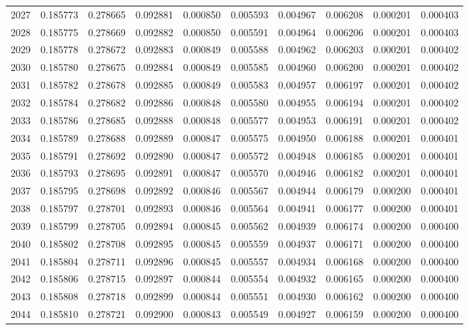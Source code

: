 \begin{tabular}{lrrrrrrrrr}
2027 & 0.185773 & 0.278665 & 0.092881 & 0.000850 & 0.005593 & 0.004967 & 0.006208 & 0.000201 & 0.000403 \\
2028 & 0.185775 & 0.278669 & 0.092882 & 0.000850 & 0.005591 & 0.004964 & 0.006206 & 0.000201 & 0.000403 \\
2029 & 0.185778 & 0.278672 & 0.092883 & 0.000849 & 0.005588 & 0.004962 & 0.006203 & 0.000201 & 0.000402 \\
2030 & 0.185780 & 0.278675 & 0.092884 & 0.000849 & 0.005585 & 0.004960 & 0.006200 & 0.000201 & 0.000402 \\
2031 & 0.185782 & 0.278678 & 0.092885 & 0.000849 & 0.005583 & 0.004957 & 0.006197 & 0.000201 & 0.000402 \\
2032 & 0.185784 & 0.278682 & 0.092886 & 0.000848 & 0.005580 & 0.004955 & 0.006194 & 0.000201 & 0.000402 \\
2033 & 0.185786 & 0.278685 & 0.092888 & 0.000848 & 0.005577 & 0.004953 & 0.006191 & 0.000201 & 0.000402 \\
2034 & 0.185789 & 0.278688 & 0.092889 & 0.000847 & 0.005575 & 0.004950 & 0.006188 & 0.000201 & 0.000401 \\
2035 & 0.185791 & 0.278692 & 0.092890 & 0.000847 & 0.005572 & 0.004948 & 0.006185 & 0.000201 & 0.000401 \\
2036 & 0.185793 & 0.278695 & 0.092891 & 0.000847 & 0.005570 & 0.004946 & 0.006182 & 0.000201 & 0.000401 \\
2037 & 0.185795 & 0.278698 & 0.092892 & 0.000846 & 0.005567 & 0.004944 & 0.006179 & 0.000200 & 0.000401 \\
2038 & 0.185797 & 0.278701 & 0.092893 & 0.000846 & 0.005564 & 0.004941 & 0.006177 & 0.000200 & 0.000401 \\
2039 & 0.185799 & 0.278705 & 0.092894 & 0.000845 & 0.005562 & 0.004939 & 0.006174 & 0.000200 & 0.000400 \\
2040 & 0.185802 & 0.278708 & 0.092895 & 0.000845 & 0.005559 & 0.004937 & 0.006171 & 0.000200 & 0.000400 \\
2041 & 0.185804 & 0.278711 & 0.092896 & 0.000845 & 0.005557 & 0.004934 & 0.006168 & 0.000200 & 0.000400 \\
2042 & 0.185806 & 0.278715 & 0.092897 & 0.000844 & 0.005554 & 0.004932 & 0.006165 & 0.000200 & 0.000400 \\
2043 & 0.185808 & 0.278718 & 0.092899 & 0.000844 & 0.005551 & 0.004930 & 0.006162 & 0.000200 & 0.000400 \\
2044 & 0.185810 & 0.278721 & 0.092900 & 0.000843 & 0.005549 & 0.004927 & 0.006159 & 0.000200 & 0.000400 \\

\end{tabular}
